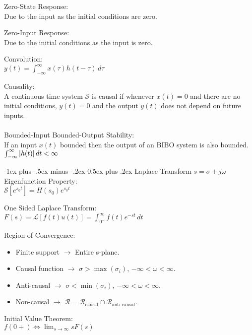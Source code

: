 \documentclass[12pt,landscape]{article}
\makeatletter
\renewcommand{\section}{\@startsection{section}{1}{0mm}%
                                {-1ex plus -.5ex minus -.2ex}%
                                {0.5ex plus .2ex}%
                                {\normalfont\normalsize\bfseries}}
\newcommand{\tab}{\hspace{0.02\textwidth}}
\newcommand{\ds}{\displaystyle}
\makeatother
\begin{document}
\begin{multicols*}{3}
Zero-State Response:\\
\tab Due to the input as the initial conditions are zero.

Zero-Input Response:\\
\tab Due to the initial conditions as the input is zero.

Convolution:\\
\tab $\ds y(t) = \int_{-\infty}^{\infty}x(\tau)h(t-\tau)\,d\tau$

Causality:\\
\tab A continuous time system $\mathcal{S}$ is causal if whenever $x(t) = 0$ and there are no initial conditions, $y(t) = 0$ and the output $y(t)$ does not depend on future inputs.
\\~\\
Bounded-Input Bounded-Output Stability:\\
\tab If an input $x(t)$ bounded then the output of an BIBO system is also bounded.\\
\tab $\int_{-\infty}^{\infty} \abs{h(t)}\,dt < \infty$

\section{Laplace Transform}
$s = \sigma + j\omega$\\

Eigenfunction Property:\\
\tab $\mathcal{S}[e^{s_0t}] = H(s_0)e^{s_0t}$

One Sided Laplace Transform:\\
\tab $\ds F(s) = \mathcal{L}[f(t)u(t)] = \int_{0^-}^{\infty}f(t)e^{-st}\,dt$

Region of Convergence:
\vspace{-0.5em}
\begin{itemize}
	\itemsep-0.33em
	\item Finite support $\rightarrow$ Entire s-plane.
	\item Causal function $\rightarrow$ $\sigma > \max(\sigma_i)$,  $-\infty < \omega < \infty$.
	\item Anti-causal $\rightarrow$ $\sigma < \min(\sigma_i)$,  $-\infty < \omega < \infty$.
	\item Non-causal $\rightarrow$ $\mathcal{R} = \mathcal{R}_\text{causal} \cap \mathcal{R}_\text{anti-causal}$.
\end{itemize}

Initial Value Theorem:\\
\tab $\ds f(0+) \Leftrightarrow \lim_{s\rightarrow\infty} sF(s)$


\end{multicols*}
\end{document}
